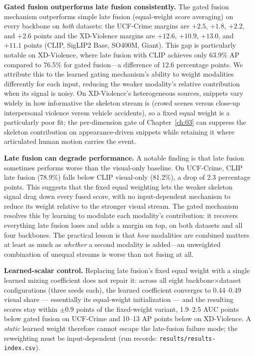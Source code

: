 \textbf{Gated fusion outperforms late fusion consistently.} The gated fusion
mechanism outperforms simple late fusion (equal-weight score averaging) on
every backbone on \emph{both} datasets: the UCF-Crime margins are $+2.5$,
$+1.8$, $+2.2$, and $+2.6$ points and the XD-Violence margins are $+12.6$,
$+10.9$, $+13.0$, and $+11.1$ points (CLIP, SigLIP2 Base, SO400M, Giant).
This gap is particularly notable on
XD-Violence, where late fusion with CLIP achieves only 63.9\% AP compared to
76.5\% for gated fusion---a difference of 12.6 percentage points. We attribute
this to the learned gating mechanism's ability to weight modalities
differently for each input, reducing the weaker modality's relative
contribution when its signal is noisy. On XD-Violence's heterogeneous sources,
snippets vary widely in how informative the skeleton stream is (crowd scenes
versus close-up interpersonal violence versus vehicle accidents), so a fixed
equal weight is a particularly poor fit; the per-dimension gate of
Chapter~\ref{ch:03} can suppress the skeleton contribution on
appearance-driven snippets while retaining it where articulated human motion
carries the event.

\textbf{Late fusion can degrade performance.} A notable finding is that late
fusion sometimes performs worse than the visual-only baseline. On UCF-Crime,
CLIP late fusion (78.9\%) falls below CLIP visual-only (81.2\%), a drop of 2.3
percentage points. This suggests that the fixed equal weighting lets the
weaker skeleton signal drag down every fused score, with no input-dependent
mechanism to reduce its weight relative to the stronger visual stream. The
gated mechanism resolves this by learning to modulate each modality's
contribution: it recovers everything late fusion loses and adds a margin on
top, on both datasets and all four backbones. The practical lesson is that
\emph{how} modalities are combined matters at least as much as \emph{whether}
a second modality is added---an unweighted combination of unequal streams is
worse than not fusing at all.

\textbf{Learned-scalar control.} Replacing late fusion's fixed equal weight
with a single learned mixing coefficient does not repair it: across all eight
backbone$\times$dataset configurations (three seeds each), the learned
coefficient converges to 0.44--0.49 visual share --- essentially its
equal-weight initialization --- and the resulting scores stay within $\pm0.9$
points of the fixed-weight variant, 1.9--2.5 AUC points below gated fusion on
UCF-Crime and 10--13 AP points below on XD-Violence. A \emph{static} learned
weight therefore cannot escape the late-fusion failure mode; the reweighting
must be input-dependent (run records: \texttt{results/results-index.csv}).

